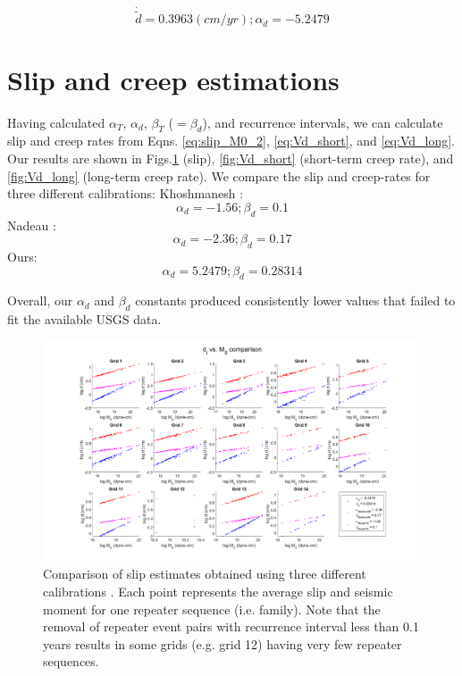 \documentclass{article}
\begin{document}
\begin{equation}
    \dot{\tilde{d}} = 0.3963 (cm/yr);
    \alpha_d = -5.2479
\end{equation}

\section{Slip and creep estimations}
Having calculated $\alpha_T$, $\alpha_d$, $\beta_T$ ($=\beta_d$), and recurrence intervals, we can calculate slip and creep rates from Eqns. \ref{eq:slip_M0_2}, \ref{eq:Vd_short}, and \ref{eq:Vd_long}. Our results are shown in Figs.\ref{fig:slip} (slip), \ref{fig:Vd_short} (short-term creep rate), and \ref{fig:Vd_long} (long-term creep rate). We compare the slip and creep-rates for three different calibrations:
\newline
Khoshmanesh \cite{khoshmanesh15}: 
\begin{equation} \alpha_d = -1.56; \beta_d = 0.1 \end{equation}
\newline
Nadeau \cite{nadeau98}: \begin{equation}\alpha_d = -2.36; \beta_d = 0.17\end{equation}
\newline
Ours: \begin{equation}\alpha_d = 5.2479; \beta_d = 0.28314\end{equation}

Overall, our $\alpha_d$ and $\beta_d$ constants produced consistently lower values that failed to fit the available USGS data.

\begin{figure}
    \includegraphics[width=10in]{slip_M0_comparison.png}%
    \caption{\label{fig:slip} Comparison of slip estimates obtained using three different calibrations \cite{nadeau98,khoshmanesh15}. Each point represents the average slip and seismic moment for one repeater sequence (i.e. family). Note that the removal of repeater event pairs with recurrence interval less than 0.1 years results in some grids (e.g. grid 12) having very few repeater sequences.}
\end{figure}
\end{document}
